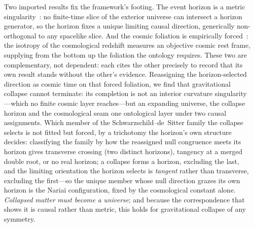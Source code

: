 \documentclass[11pt,a4paper]{article}
\theoremstyle{plain}
\theoremstyle{definition}
\theoremstyle{remark}
\begin{document}
Two imported results fix the framework's footing. The event horizon is a metric singularity~\cite{JanzenBHcausality}: no finite-time slice of the exterior universe can intersect a horizon generator, so the horizon fixes a unique limiting causal direction, generically non-orthogonal to any spacelike slice. And the cosmic foliation is empirically forced~\cite{JanzenModernParallax}: the isotropy of the cosmological redshift measures an objective cosmic rest frame, supplying from the bottom up the foliation the ontology requires. These two are complementary, not dependent: each cites the other precisely to record that its own result stands without the other's evidence. Reassigning the horizon-selected direction as cosmic time on that forced foliation, we find that gravitational collapse cannot terminate: its completion is not an interior curvature singularity---which no finite cosmic layer reaches---but an expanding universe, the collapse horizon and the cosmological seam one ontological layer under two causal assignments. Which member of the Schwarzschild--de~Sitter family the collapse selects is not fitted but forced, by a trichotomy the horizon's own structure decides: classifying the family by how the reassigned null congruence meets its horizon gives transverse crossing (two distinct horizons), tangency at a merged double root, or no real horizon; a collapse forms a horizon, excluding the last, and the limiting orientation the horizon selects is \emph{tangent} rather than transverse, excluding the first---so the unique member whose null direction grazes its own horizon is the Nariai configuration, fixed by the cosmological constant alone. \emph{Collapsed matter must become a universe}; and because the correspondence that shows it is causal rather than metric, this holds for gravitational collapse of any symmetry.
\end{document}
